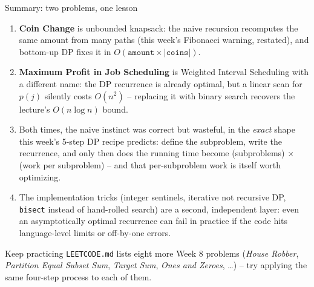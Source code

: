 \documentclass[11pt,aspectratio=169]{beamer}
\begin{document}
\begin{frame}{Summary: two problems, one lesson}
  \footnotesize
  \begin{enumerate}
    \item \textbf{Coin Change} is unbounded knapsack: the naive recursion recomputes
    the same amount from many paths (this week's Fibonacci warning, restated), and
    bottom-up DP fixes it in $O(\texttt{amount}\times|\texttt{coins}|)$.
    \item \textbf{Maximum Profit in Job Scheduling} is Weighted Interval Scheduling with
    a different name: the DP recurrence is already optimal, but a linear scan for
    $p(j)$ silently costs $O(n^2)$ -- replacing it with binary search recovers the
    lecture's $O(n\log n)$ bound.
    \item Both times, the naive instinct was correct but wasteful, in the \emph{exact}
    shape this week's 5-step DP recipe predicts: define the subproblem, write the
    recurrence, and only then does the running time become (subproblems) $\times$
    (work per subproblem) -- and that per-subproblem work is itself worth optimizing.
    \item The implementation tricks (integer sentinels, iterative not recursive DP,
    \texttt{bisect} instead of hand-rolled search) are a second, independent layer:
    even an asymptotically optimal recurrence can fail in practice if the code hits
    language-level limits or off-by-one errors.
  \end{enumerate}
  \begin{alertblock}{Keep practicing}
    \texttt{LEETCODE.md} lists eight more Week 8 problems (\emph{House Robber},
    \emph{Partition Equal Subset Sum}, \emph{Target Sum}, \emph{Ones and Zeroes},
    \dots) -- try applying the same four-step process to each of them.
  \end{alertblock}
\end{frame}
\end{document}
